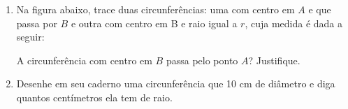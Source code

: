 \documentclass[a4paper,14pt]{article}
\begin{document}
\begin{multicols}{2}
\begin{enumerate}
	   		\item Na figura abaixo, trace duas circunferências: uma com centro em $A$ e que passa por $B$ e outra com centro em B e raio igual a $r$, cuja medida é dada a seguir:
	   		\begin{center}
		   	\end{center}
		   	A circunferência com centro em $B$ passa pelo ponto $A$? Justifique.
		   	\item Desenhe em seu caderno uma circunferência que 10 cm de diâmetro e diga quantos centímetros ela tem de raio.
	    \end{enumerate} 

\end{multicols}
\end{document}
